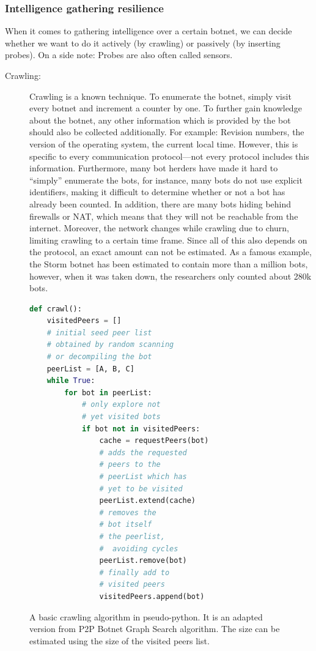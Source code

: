 \documentclass[10pt, a4paper, twocolumn]{article} %
\begin{document}
\subsubsection{Intelligence gathering resilience}
When it comes to gathering intelligence over a certain botnet, we can decide whether we want to do it actively (by crawling) or passively (by inserting probes). On a side note: Probes are also often called sensors.
\begin{description}
\item[Crawling:] Crawling is a known technique. To enumerate the botnet, simply visit every botnet and increment a counter by one. To further gain knowledge about the botnet, any other information which is provided by the bot should also be collected additionally. For example: Revision numbers, the version of the operating system, the current local time. However, this is specific to every communication protocol---not every protocol includes this information. Furthermore, many bot herders have made it hard to ``simply'' enumerate the bots, for instance, many bots do not use explicit identifiers, making it difficult to determine whether or not a bot has already been counted. In addition, there are many bots hiding behind firewalls or NAT, which means that they will not be reachable from the internet. Moreover, the network changes while crawling due to churn, limiting crawling to a certain time frame\cite{defcon21}. Since all of this also depends on the protocol, an exact amount can not be estimated. As a famous example, the Storm botnet has been estimated to contain more than a million bots, however, when it was taken down, the researchers only counted about 280k bots\cite{storm}. 
\end{description}

\begin{figure}[ht]
   \begin{lstlisting}[language=python]
def crawl():
    visitedPeers = []
    # initial seed peer list
    # obtained by random scanning
    # or decompiling the bot
    peerList = [A, B, C]
    while True:
        for bot in peerList:
            # only explore not 
            # yet visited bots
            if bot not in visitedPeers:
                cache = requestPeers(bot)
                # adds the requested 
                # peers to the 
                # peerList which has
                # yet to be visited
                peerList.extend(cache)
                # removes the  
                # bot itself 
                # the peerlist,
                #  avoiding cycles
                peerList.remove(bot)
                # finally add to 
                # visited peers
                visitedPeers.append(bot)
    \end{lstlisting} 
    \caption{A basic crawling algorithm in pseudo-python. It is an adapted version from \citet{p2pwned} P2P Botnet Graph Search algorithm. The size can be estimated using the size of the visited peers list.}
\end{figure}
\end{document}
